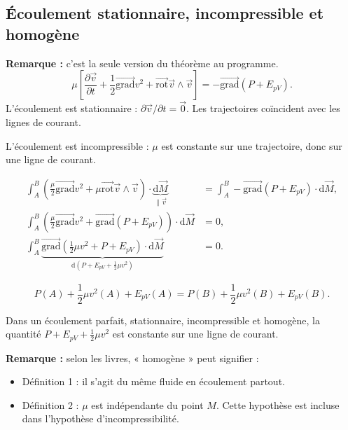 \documentclass[11pt,a4paper]{article}
\newcommand{\dd}{\mathrm d}
\newcommand{\grad}{\overrightarrow{\mathrm{grad}}}
\newcommand{\pd}[2]{\frac{\partial #1}{\partial #2}}
\newcommand{\etoiles}[1]{\foreach \i in {1,...,#1}{\mathord{\star}\,}}
\newcommand{\rot}{\overrightarrow{\mathrm{rot}}}
\newcommand{\epv}{E_{pV}}
\begin{document}
\subsection{Écoulement stationnaire, incompressible et homogène}
\textbf{Remarque :} c'est la seule version du théorème au programme.
\[\mu\left[\pd{\vec v}t+\frac12\grad v^2+\rot\vec v\wedge\vec v\right]=-\grad(P+\epv).\]
L'écoulement est stationnaire : $\partial\vec v/\partial t=\vec0$. Les trajectoires coïncident avec les lignes de courant.

L'écoulement est incompressible : $\mu$ est constante sur une trajectoire, donc sur une ligne de courant.
\begin{center}\end{center}
\begin{align*}
\int_A^B\left(\frac\mu2\grad v^2+\mu\rot\vec v\wedge\vec v\right)\cdot\underbrace{\dd\vec M}_{\parallel\vec v}
&=\int_A^B-\grad(P+\epv)\cdot\dd\vec M,\\[4pt]
\int_A^B\left(\frac\mu2\grad v^2+\grad(P+\epv)\right)\cdot\dd\vec M&=0,\\[4pt]
\int_A^B\underbrace{\grad\left(\frac12\mu v^2+P+\epv\right)\cdot\dd\vec M}_{\dd(P+\epv+\frac12\mu v^2)}&=0.
\end{align*}
\begin{cadre}[etoiles={\etoiles{5}}]\[P(A)+\frac12\mu v^2(A)+\epv(A)=P(B)+\frac12\mu v^2(B)+\epv(B).\]\end{cadre}
\begin{cadre}
Dans un écoulement parfait, stationnaire, incompressible et homogène, la quantité $P+\epv+\frac12\mu v^2$ est constante sur une ligne de courant.
\end{cadre}
\textbf{Remarque :} selon les livres, « homogène » peut signifier :
\begin{itemize}
\item Définition 1 : il s'agit du même fluide en écoulement partout.
\item Définition 2 : $\mu$ est indépendante du point $M$. Cette hypothèse est incluse dans l'hypothèse d'incompressibilité.
\end{itemize}
\end{document}
